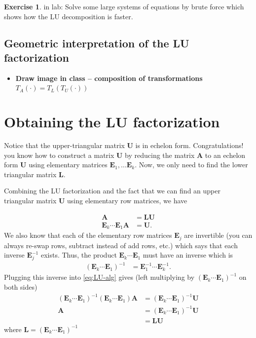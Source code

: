 \documentclass[
]{book}
\providecommand{\tightlist}{%
  \setlength{\itemsep}{0pt}\setlength{\parskip}{0pt}}
\theoremstyle{definition}
\theoremstyle{definition}
\theoremstyle{definition}
\newtheorem{exercise}{Exercise}[chapter]
\theoremstyle{definition}
\theoremstyle{remark}
\begin{document}
\begin{exercise}
in lab:
Solve some large systems of equations by brute force which shows how the LU decomposition is faster.
\end{exercise}

\hypertarget{geometric-interpretation-of-the-lu-factorization}{%
\subsection{Geometric interpretation of the LU factorization}\label{geometric-interpretation-of-the-lu-factorization}}

\begin{itemize}
\tightlist
\item
  \textbf{Draw image in class -- composition of transformations \(T_A(\cdot) = T_L(T_U(\cdot))\)}
\end{itemize}

\hypertarget{obtaining-the-lu-factorization}{%
\section{Obtaining the LU factorization}\label{obtaining-the-lu-factorization}}

Notice that the upper-triangular matrix \(\mathbf{U}\) is in echelon form. Congratulations! you know how to construct a matrix \(\mathbf{U}\) by reducing the matrix \(\mathbf{A}\) to an echelon form \(\mathbf{U}\) using elementary matrices \(\mathbf{E}_1, \ldots \mathbf{E}_k\). Now, we only need to find the lower triangular matrix \(\mathbf{L}\).

Combining the LU factorization and the fact that we can find an upper triangular matrix \(\mathbf{U}\) using elementary row matrices, we have

\[
\begin{aligned}
\mathbf{A} & = \mathbf{L} \mathbf{U} \\
\mathbf{E}_k \cdots \mathbf{E}_1 \mathbf{A} & = \mathbf{U}.
\end{aligned}
\label{eq:LU-alg}
\]
We also know that each of the elementary row matrices \(\mathbf{E}_j\) are invertible (you can always re-swap rows, subtract instead of add rows, etc.) which says that each inverse \(\mathbf{E}_j^{-1}\) exists. Thus, the product \(\mathbf{E}_k \cdots \mathbf{E}_1\) must have an inverse which is
\[
\begin{aligned}
(\mathbf{E}_k \cdots \mathbf{E}_1)^{-1} & = \mathbf{E}_1^{-1} \cdots \mathbf{E}_k^{-1}.
\end{aligned}
\]
Plugging this inverse into \eqref{eq:LU-alg} gives (left multiplying by \((\mathbf{E}_k \cdots \mathbf{E}_1)^{-1}\) on both sides)
\[
\begin{aligned}
(\mathbf{E}_k \cdots \mathbf{E}_1)^{-1} (\mathbf{E}_k \cdots \mathbf{E}_1) \mathbf{A} & = (\mathbf{E}_k \cdots \mathbf{E}_1)^{-1}\mathbf{U} \\
 \mathbf{A} & = (\mathbf{E}_k \cdots \mathbf{E}_1)^{-1}\mathbf{U} \\
 & = \mathbf{L} \mathbf{U}
\end{aligned}
\]
where \(\mathbf{L} = (\mathbf{E}_k \cdots \mathbf{E}_1)^{-1}\)
\end{document}
